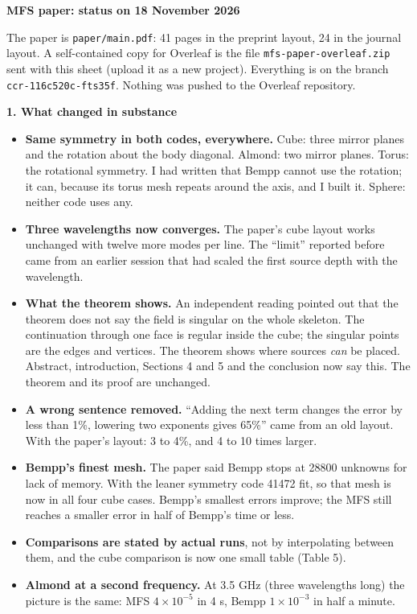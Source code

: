 \documentclass[11pt]{article}
\begin{document}
{\large\bfseries MFS paper: status on 18 November 2026}

The paper is \texttt{paper/main.pdf}: 41 pages in the preprint layout, 24 in the journal layout. A self-contained copy for Overleaf is the file \texttt{mfs-paper-overleaf.zip} sent with this sheet (upload it as a new project). Everything is on the branch \texttt{ccr-116c520c-fts35f}. Nothing was pushed to the Overleaf repository.

\textbf{1. What changed in substance}
\begin{itemize}
\item \textbf{Same symmetry in both codes, everywhere.} Cube: three mirror planes and the rotation about the body diagonal. Almond: two mirror planes. Torus: the rotational symmetry. I had written that Bempp cannot use the rotation; it can, because its torus mesh repeats around the axis, and I built it. Sphere: neither code uses any.
\item \textbf{Three wavelengths now converges.} The paper's cube layout works unchanged with twelve more modes per line. The ``limit'' reported before came from an earlier session that had scaled the first source depth with the wavelength.
\item \textbf{What the theorem shows.} An independent reading pointed out that the theorem does not say the field is singular on the whole skeleton. The continuation through one face is regular inside the cube; the singular points are the edges and vertices. The theorem shows where sources \emph{can} be placed. Abstract, introduction, Sections 4 and 5 and the conclusion now say this. The theorem and its proof are unchanged.
\item \textbf{A wrong sentence removed.} ``Adding the next term changes the error by less than 1\%, lowering two exponents gives 65\%'' came from an old layout. With the paper's layout: 3 to 4\%, and 4 to 10 times larger.
\item \textbf{Bempp's finest mesh.} The paper said Bempp stops at 28800 unknowns for lack of memory. With the leaner symmetry code 41472 fit, so that mesh is now in all four cube cases. Bempp's smallest errors improve; the MFS still reaches a smaller error in half of Bempp's time or less.
\item \textbf{Comparisons are stated by actual runs}, not by interpolating between them, and the cube comparison is now one small table (Table 5).
\item \textbf{Almond at a second frequency.} At 3.5 GHz (three wavelengths long) the picture is the same: MFS $4\times10^{-5}$ in 4 s, Bempp $1\times10^{-3}$ in half a minute.
\end{itemize}
\end{document}
